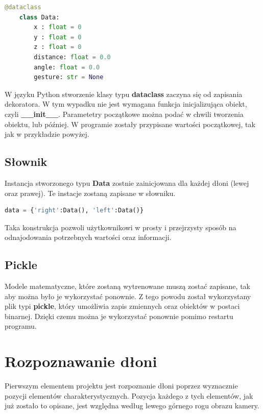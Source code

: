 \begin{lstlisting}[language=python, style=programming]
    @dataclass
    class Data:
        x : float = 0
        y : float = 0
        z : float = 0
        distance: float = 0.0
        angle: float = 0.0
        gesture: str = None
\end{lstlisting}

\quad W języku Python stworzenie klasy typu \textbf{dataclass} zaczyna się od zapisania dekoratora. W tym wypadku nie jest wymagana funkcja inicjalizująca obiekt, czyli \textbf{\_\_init\_\_}. Parametetry początkowe można podać w chwili tworzenia obiektu, lub później. W programie zostały przypisane wartości początkowej, tak jak w przykładzie powyżej. 

\subsection{Słownik}

\quad Instancja stworzonego typu \textbf{Data} zostnie zainicjowana dla każdej dłoni (lewej oraz prawej). Te instacje zostaną zapisane w słowniku. 

\begin{lstlisting}[language=python, style=programming]
    data = {'right':Data(), 'left':Data()}
\end{lstlisting}

\quad Taka konstrukcja pozwoli użytkownikowi w prosty i przejrzysty sposób na odnajodowania potrzebnych wartości oraz informacji. 

\subsection{Pickle}
\quad Modele matematyczne, które zostaną wytrenowane muszą zostać zapisane, tak aby można było je wykorzystać ponownie. Z tego powodu został wykorzystany plik typi \textbf{pickle}, który umożliwia zapis zmiennych oraz obiektów w postaci binarnej. Dzięki czemu można je wykorzystać ponownie pomimo restartu programu. 

\section{Rozpoznawanie dłoni}

\quad Pierwszym elementem projektu jest rozpoznanie dłoni poprzez wyznacznie pozycji elementów charakterystycznych. Pozycja każdego z tych elementów, jak już zostało to opisane, jest względna według lewego górnego rogu obrazu kamery. 

